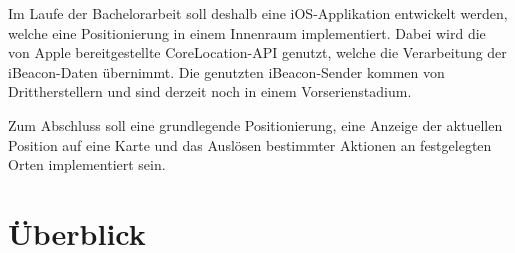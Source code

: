 Im Laufe der Bachelorarbeit soll deshalb eine iOS-Applikation entwickelt werden, welche eine Positionierung in einem Innenraum implementiert. Dabei wird die von Apple bereitgestellte CoreLocation-API genutzt, welche die Verarbeitung der iBeacon-Daten übernimmt. Die genutzten iBeacon-Sender kommen von Drittherstellern und sind derzeit noch in einem Vorserienstadium. 

Zum Abschluss soll eine grundlegende Positionierung, eine Anzeige der aktuellen Position auf eine Karte und das Auslösen bestimmter Aktionen an festgelegten Orten implementiert sein.


\section{Überblick}
\label{sec:introduction:overview}

